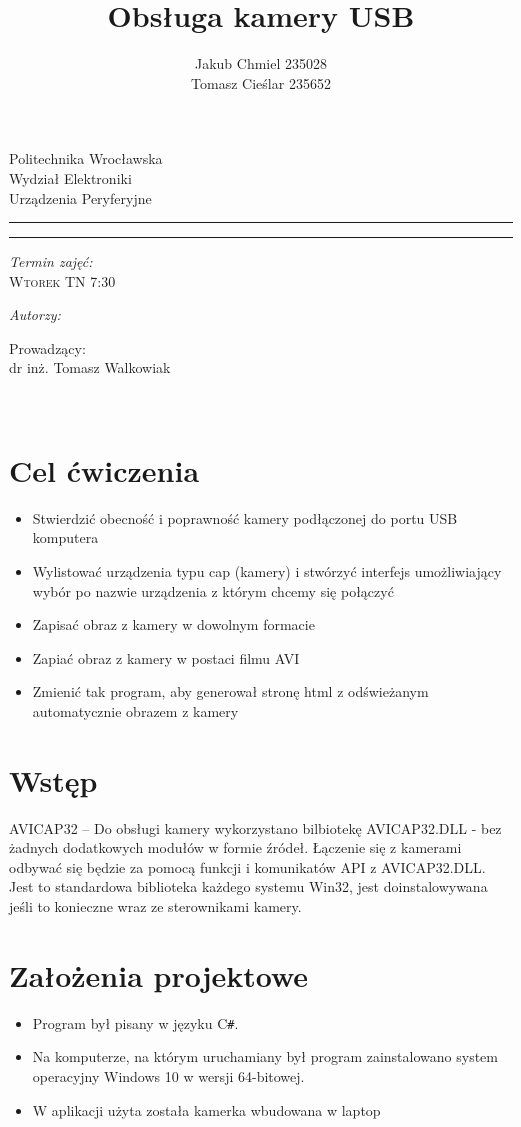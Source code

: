 \documentclass[12pt,a4paper,notitlepage]{report}
\author{ Jakub Chmiel  235028 \\ Tomasz Cieślar 235652}
\title{Obsługa kamery  USB}
\makeatletter
\newcommand{\linia}{\rule{\linewidth}{0.4mm}}
\renewcommand{\maketitle}{\begin{titlepage}
    \vspace*{1cm}
    \begin{center}\small
    Politechnika Wrocławska\\
    Wydział Elektroniki\\
    Urządzenia Peryferyjne 
    \end{center}
    \vspace{4.5cm}
    \noindent\linia
    \begin{center}
      \LARGE \textsc{\@title}
         \end{center}
     \linia
    \vspace{0.5cm}
    \begin{flushright}
    \begin{minipage}{6cm}
    
     \vspace{4cm}
     \textit{\small Termin zajęć:}\\
     \normalsize \textsc{Wtorek TN 7:30} \par
	\vspace{0.3cm}    
    \textit{\small Autorzy:}\\
    \normalsize \textsc{\@author} \par
     \vspace{0.3cm}
        Prowadzący: \\ dr inż. Tomasz Walkowiak

    \end{minipage}
    \vspace{1cm}
     {\small }\\
       
     \end{flushright}
    \vspace*{\stretch{3}}
    \begin{center}
    \@date
    \end{center}
  \end{titlepage}%
}
\makeatother
\begin{document}
\maketitle

\newpage
\tableofcontents
\newpage
\renewcommand*\thesection{\arabic{section}}
\section{Cel ćwiczenia}
\begin{itemize}
\item Stwierdzić obecność i poprawność kamery podłączonej do portu USB komputera
\item Wylistować urządzenia typu cap (kamery) i stwórzyć interfejs umożliwiający wybór po nazwie urządzenia z którym chcemy się połączyć
\item Zapisać obraz z kamery w dowolnym formacie
\item Zapiać obraz z kamery w postaci filmu AVI
\item Zmienić tak program, aby generował stronę html z odświeżanym automatycznie obrazem z kamery

\end{itemize}

\section{Wstęp}
AVICAP32  – Do obsługi kamery wykorzystano bilbiotekę AVICAP32.DLL - bez żadnych dodatkowych modułów w formie źródeł. Łączenie się z kamerami odbywać się będzie za pomocą funkcji i komunikatów API z AVICAP32.DLL. Jest to standardowa biblioteka każdego systemu Win32, jest doinstalowywana jeśli to konieczne wraz ze sterownikami kamery.

\section{Założenia projektowe}
\begin{itemize}
\item Program był pisany w języku C\texttt{\#}.
\item Na komputerze, na którym uruchamiany był program zainstalowano system operacyjny Windows 10 w wersji 64-bitowej.
\item W aplikacji użyta została kamerka wbudowana w laptop
\end{itemize}
\end{document}
